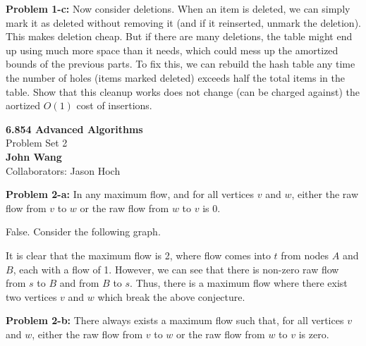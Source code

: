 \documentclass[psamsfonts]{amsart}
\newenvironment{sol}{\vspace{0.25cm}{\large \bfseries Solution:}}{\qedsymbol}
\newenvironment{prob}[1]{\begin{framed}{\large \bfseries Problem #1:}}{\end{framed}}
\newcommand{\makenewtitle}{
    \begin{center}
    {\huge \bfseries 6.854 Advanced Algorithms} \\
    Problem Set 2\\
    \vspace{0.25cm}
    {\bfseries John Wang} \\
    Collaborators: Jason Hoch
    \end{center}
    \vspace{0.5cm}
}
\begin{document}
\begin{prob}{1-c}
Now consider deletions. When an item is deleted, we can simply mark it as deleted without removing it (and if it reinserted, unmark the deletion). This makes deletion cheap. But if there are many deletions, the table might end up using much more space than it needs, which could mess up the amortized bounds of the previous parts. To fix this, we can rebuild the hash table any time the number of holes (items marked deleted) exceeds half the total items in the table. Show that this cleanup works does not change (can be charged against) the aortized $O(1)$ cost of insertions.
\end{prob}
\begin{sol}
\end{sol}

\newpage 
\makenewtitle

\begin{prob}{2-a}
In any maximum flow, and for all vertices $v$ and $w$, either the raw flow from $v$ to $w$ or the raw flow from $w$ to $v$ is 0.
\end{prob}
\begin{sol}
False. Consider the following graph.

\begin{figure}[h!]
\centering
{}
\end{figure}

It is clear that the maximum flow is 2, where flow comes into $t$ from nodes $A$ and $B$, each with a flow of 1. However, we can see that there is non-zero raw flow from $s$ to $B$ and from $B$ to $s$. Thus, there is a maximum flow where there exist two vertices $v$ and $w$ which break the above conjecture.
\end{sol}

\begin{prob}{2-b}
There always exists a maximum flow such that, for all vertices $v$ and $w$, either the raw flow from $v$ to $w$ or the raw flow from $w$ to $v$ is zero.
\end{prob}
\end{document}

